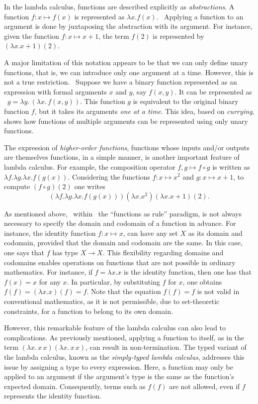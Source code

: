 In the lambda calculus, functions are described explicitly as \emph{abstractions}. A function $f:x \mapsto f(x)$ is represented as $\lambda x.f(x)$.  Applying a function to an argument is done by juxtaposing the abstraction with its argument. For instance, given the function $f:x \mapsto x+1$, the term $f(2)$ is represented by $(\lambda x.x+1)(2)$.

A major limitation of this notation appears to be that we can only define unary functions, that is, we can introduce only one argument at a time. However, this is not a true restriction.  Suppose we have a binary function represented as an expression with formal arguments $ x $ and $ y $, say $f(x, y)$. It can be represented as  $g = \lambda y.\, (\lambda x.\, f(x, y))$.
This function $ g $ is equivalent to the original binary function $ f $, but it takes its arguments \emph{one at a time}. This idea, based on \emph{currying}, shows how functions of multiple arguments can be represented using only unary functions.

The expression of \emph{higher‑order functions}, functions whose inputs and/or outputs are themselves functions, in a simple manner, is another important feature of lambda calculus. For example, the composition operator $f,g \mapsto f \circ g$ is written as $\lambda f. \lambda g. \lambda x. f(g(x))$. Considering the functions $f:x \mapsto x^2$ and $g:x \mapsto x+1$, to compute $(f \circ g)(2)$ one writes $$(\lambda f. \lambda g. \lambda x. f(g(x)))(\lambda x.x^2)(\lambda x.x+1)(2).$$

As mentioned above,  within  the ``functions as rule'' paradigm, is not
always necessary to specify the domain and codomain of a function in advance. For instance, the identity function $f: x \mapsto x$, can have any set $X$ as its domain and codomain, provided that the domain and codomain are the same. In this case, one says that $f$ has type $X \rightarrow{} X$. This flexibility regarding domains and codomains enables operations on functions that are not possible in ordinary mathematics. For instance, if $f = \lambda x.x$ is the identity function, then one has that $f(x) = x$ for any $x$. In particular, by substituting $f$ for $x$, one obtains $f(f) = (\lambda x.x)(f) = f$. Note that the equation $f(f) = f$ is not valid in conventional mathematics, as it is not permissible, due to set-theoretic constraints, for a function to belong to its own domain.

However, this remarkable feature of the lambda calculus can also lead to complications. 
As previously mentioned, applying a function to itself, as in the term $(\lambda x.\,x\,x)(\lambda x.\,x\,x)$, can result in non-termination. 
The typed variant of the lambda calculus, known as the \emph{simply-typed lambda calculus}, addresses this issue by assigning a type to every expression. 
Here, a function may only be applied to an argument if the argument's type is the same as the function's expected domain. Consequently, terms such as $f(f)$ are not allowed, even if $f$ represents the identity function.



